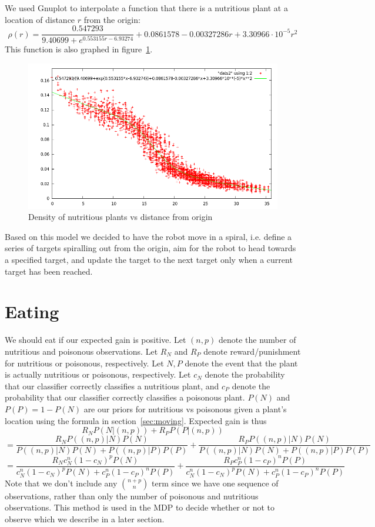 \documentclass{article}
\begin{document}
We used Gnuplot to interpolate a function that there is a nutritious
plant at a location of distance $r$ from the origin:
$$\rho(r)=\frac{0.547293}{9.40699+e^{0.553155r-6.93274}}+0.0861578-0.00327286r+3.30966\cdot10^{-5}r^2$$
This function is also graphed in figure~\ref{fig:plant_freq}.
\begin{centering}
\begin{figure}[here]
\includegraphics[scale=0.55]{nutritiousmodel.png}
\caption{Density of nutritious plants vs distance from origin}
\label{fig:plant_freq}
\end{figure}
\end{centering}

Based on this model we decided to have the robot move in a spiral,
i.e. define a series of targets spiralling out from the origin,
aim for the robot to head towards a specified target, and update 
the target to the next target only when a current target has been
reached. 

\section{Eating}
\label{sec:eating}
We should eat if our expected gain is positive. 
Let $(n,p)$ denote the number of nutritious and poisonous observations.
Let $R_N$ and $R_P$ denote reward/punishment for nutritious or poisonous,
respectively. Let $N,P$ denote the event that the plant is actually
nutritious or poisonous, respectively. 
Let $c_N$ denote the probability that our classifier correctly classifies
a nutritious plant, and $c_P$ denote the probability that our classifier
correctly classifies a poisonous plant. $P(N)$ and $P(P)=1-P(N)$ are our priors
for nutritious vs poisonous given a plant's location using the formula
in section~\ref{sec:moving}. 
Expected gain is thus
$$R_N P(N|(n,p)) +R_P  P(P|(n,p))$$ 
$$= \frac{R_NP((n,p)|N) P(N)}{P((n,p)|N)P(N)+P((n,p)|P)P(P)} + \frac{R_PP((n,p)|N)P(N)}{P((n,p)|N)P(N)+P((n,p)|P)P(P)}$$
$$= \frac{R_Nc_N^n(1-c_N)^p P(N)}{ c_N^n(1-c_N)^p P(N) +  c_P^n(1-c_P)^n P(P)} + \frac{R_P c_P^n(1-c_P)^n P(P) }{ c_N^n(1-c_N)^p P(N)+c_P^n(1-c_P)^n P(P)}$$
Note that we don't include any ${n+p\choose n}$ term since we have one
sequence of observations, rather than only the number of poisonous and nutritious
observations. 
This method is used in the MDP to decide whether or not to observe
which we describe in a later section. 
\end{document}
